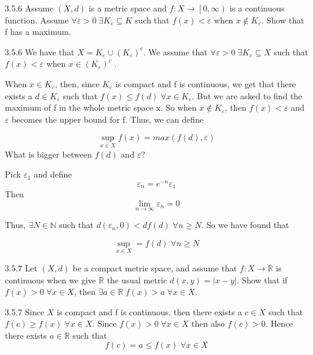 \documentclass[a4paper,norsk]{article}
\renewcommand{\geq}{\geqslant}
\renewcommand{\leq}{\leqslant}
\renewcommand{\epsilon}{\varepsilon}
\begin{document}
\begin{oppgavebox}{3.5.6}{}
Assume $ \left( X, d \right)  $ is a metric space and $ f : X \rightarrow \left[ 0, \infty \right)  $ is a continuous function. Assume $ \forall  \epsilon > 0 \; \exists  K_{ \epsilon } \subseteq K $ such that $ f(x) < \epsilon  $ when $ x \notin K_{ \epsilon } $. Show that f has a maximum.

\begin{proofbox}{3.5.6}{}
  We have that $ X = K_{ \epsilon } \cup \left( K_{ \epsilon } \right)^c  $. We assume that $ \forall  \epsilon > 0 \; \exists K_{ \epsilon } \subseteq X $ such that $ f(x) < \epsilon  $ when $ x \in \left( K_{ \epsilon }  \right)^c$  .


  When $ x \in K_{ \epsilon } $, then, since $ K_{ \epsilon } $ is compact and f is continuous, we get that there exists a $ d \in K_{ \epsilon } $ such that $ f(x) \leq f(d) \; \forall x \in K_{ \epsilon } $. But we are asked to find the maximum of f in the whole metric space x. So when $ x \notin K_{ \epsilon } $, then $ f(x) < \epsilon  $ and $ \epsilon   $ becomes the upper bound for f. Thus, we can define 

  \[
      \sup_{ x \in X} f(x) = max \left( f(d), \epsilon \right) 
  \]
  What is bigger between $ f(d)  $  and $ \epsilon  $?

  Pick $ \epsilon _1 $ and define
  \[
      \epsilon _n = e^{-n} \epsilon _1
  \]
  Then 
  \[
      \lim_{n \to \infty} \epsilon _n = 0
  \]
  
  Thus, $ \exists N \in \mathbb{N} $ such that $  d \left( \epsilon _n, 0 \right) < d f(d) \; \forall n \geq N $. So we have found that

  \[
      \sup_{x \in X} = f(d) \; \forall n \geq N
  \]
\end{proofbox}
\end{oppgavebox}

\begin{oppgavebox}{3.5.7}{}
Let $ \left( X, d \right)  $ be a compact metric space, and assume that $ f: X \rightarrow \mathbb{R} $ is continuous when we give $ \mathbb{R} $ the usual metric $ d \left( x, y \right) = \left| x - y \right|  $. Show that if $ f(x) > 0 \; \forall  x \in X $, then $ \exists a \in \mathbb{R} \; f(x) > a \; \forall x \in X $.

\begin{proofbox}{3.5.7}{}
  Since $ X $ is compact and f is continuous, then there exists a $ c \in X $ such that $ f(c) \geq f(x) \; \forall x \in X $. Since $ f(x) > 0 \; \forall  x \in X $  then also $ f(c) > 0 $. Hence there exists $ a \in \mathbb{R} $ such that
  \[
      f(c) = a \leq f(x) \; \forall x \in X
  \]
\end{proofbox}
\end{oppgavebox}
\end{document}
